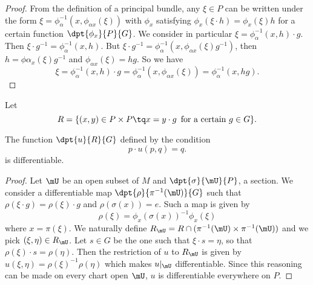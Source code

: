 																																								 \begin{proof}

																																								 From the definition of a principal bundle, any $\xi\in P$ can be written under the form $\xi=\phi_{\alpha}^{-1}(x,\phi_{\alpha x}(\xi))$ with $\phi_x$ satisfying $\phi_x(\xi\cdot h)=\phi_x(\xi)h$ for a certain function $\dpt{\phi_x}{P}{G}$.  We consider in particular $\xi=\phi_{\alpha}^{-1}(x,h)\cdot g$. Then $\xi\cdot g^{-1}=\phi_{\alpha}^{-1}(x,h)$. But $\xi\cdot g^{-1}=\phi_{\alpha}^{-1}(x,\phi_{\alpha x}(\xi)g^{-1})$, then $h=\phi{\alpha_x}(\xi)g^{-1}$ and $\phi_{\alpha x}(\xi)=hg$. So we have
																																								 \[
																																									 \xi=\phi_{\alpha}^{-1}(x,h)\cdot g=\phi_{\alpha}^{-1}(x,\phi_{\alpha x}(\xi))=\phi_{\alpha}^{-1}(x,hg).
																																									 \]

																																									 \end{proof}

																																									 Let
																																									 \[
																																										 R=\{ (x,y)\in P\times P\tq x=y\cdot g\,\textrm{ for a certain $g\in G$}  \}.
																																										 \]

																																										 \begin{proposition}
																																										 The function $\dpt{u}{R}{G}$ defined by the condition
																																										 \[
																																											 p\cdot u(p,q)=q.
																																											 \]
																																											 is differentiable.
																																											 \end{proposition}

																																											 \begin{proof}
																																											 Let $\mU$ be an open subset of $M$ and $\dpt{\sigma}{\mU}{P}$, a section. We consider a differentiable map $\dpt{\rho}{\pi^{-1}(\mU)}{G}$ such that $\rho(\xi\cdot g)=\rho(\xi)\cdot g$ and $\rho(\sigma(x))=e$. Such a map is given by
	\[
\rho(\xi)=\phi_x(\sigma(x))^{-1}\phi_x(\xi)
	\]
	where $x=\pi(\xi)$. We naturally define $R_{\mU}=R\cap( \pi^{-1}(\mU)\times\pi^{-1}(\mU) )$ and we pick $(\xi,\eta)\in R_{\mU}$. Let $s\in G$ be the one such that $\xi\cdot s=\eta$, so that $\rho(\xi)\cdot s=\rho(\eta)$. Then the restriction of $u$ to $R_{\mU}$ is given by $u(\xi,\eta)=\rho(\xi)^{-1}\rho(\eta)$ which makes $u|_{\mU}$ differentiable. Since this reasoning can be made on every chart open $\mU$, $u$ is differentiable everywhere on $P$.
	\end{proof}

